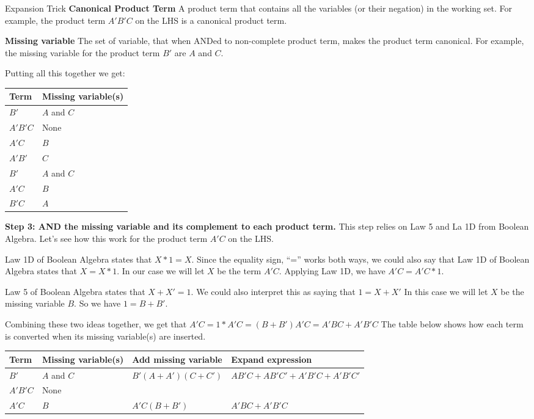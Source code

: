 \begin{process}{Expansion Trick}
   \tabitem \textbf{Canonical Product Term} A product term that contains all the variables (or their negation) in the working set.
   For example, the product term $A'B'C$ on the LHS is a canonical product term.
   
   \tabitem \textbf{Missing variable} The set of variable, that when ANDed to non-complete product term, makes the product term canonical.
   For example, the missing variable for the product term $B'$ are $A$ and $C$.


Putting all this together we get:

\begin{tabular}[ht]{l|l}
Term		& Missing variable(s)		\\ \hline
$B'$		& $A$ and $C$			\\ \hline
$A'B'C$	& None					\\ \hline
$A'C$		& $B$						\\ \hline

$A'B'$		& $C$						\\ \hline
$B'$		& $A$ and $C$			\\ \hline
$A'C$		& $B$						\\ \hline
$B'C$		& $A$						\\ 
\end{tabular}
\vspace{0.2cm}

\textbf{Step 3: AND the missing variable and its complement to each product term.}
This step relies on Law 5 and La 1D from Boolean Algebra.  Let's see how this work for the 
product term $A'C$ on the LHS.  

Law 1D of Boolean Algebra states that $X*1 = X$. Since the 
equality sign, ``='' works both ways, we could also say that Law 1D of Boolean Algebra states
that $X = X*1$.  In our case we will let $X$ be the term $A'C$.  Applying Law 1D, we have 
$A'C = A'C*1$.

Law 5 of Boolean Algebra states that $X+X' = 1$.  We could also interpret this as saying that 
$1 = X+X'$  In this case we will let $X$ be the missing variable $B$.  So we have
$1 = B+B'$.

Combining these two ideas together, we get that $A'C = 1*A'C = (B+B')A'C = A'BC + A'B'C$
The table below shows how each term is converted when its missing variable(s) are inserted.

\begin{tabular}[ht]{m{1cm}|m{2cm}|m{3cm}|m{3cm}}
Term		& Missing variable(s)	& Add missing variable	& Expand expression						\\ \hline
$B'$		& $A$ and $C$		&	$B'(A + A')(C + C')$		&	$AB'C+AB'C' + A'B'C+A'B'C'$		\\ \hline
$A'B'C$	& None			&						&							\\ \hline
$A'C$		& $B$			&	$A'C(B+B')$				&	$A'BC+A'B'C$				\\ \hline


\end{tabular}
\end{process}
